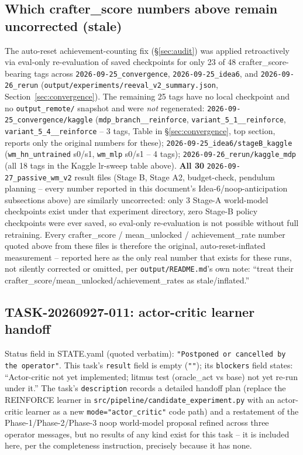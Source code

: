 \documentclass[11pt]{article}
\newcommand{\srcpath}[1]{\texttt{\small #1}}
\begin{document}
\subsection{Which crafter\_score numbers above remain uncorrected (stale)}

The auto-reset achievement-counting fix (\S\ref{sec:audit}) was applied retroactively via
eval-only re-evaluation of saved checkpoints for only 23 of 48 crafter\_score-bearing tags across
\srcpath{2026-09-25\_convergence}, \srcpath{2026-09-25\_idea6}, and \srcpath{2026-09-26\_rerun}
(\srcpath{output/experiments/reeval\_v2\_summary.json}, Section~\ref{sec:convergence}). The
remaining 25 tags have no local checkpoint and no \srcpath{output\_remote/} snapshot and were
\emph{not} regenerated: \texttt{2026-09-25\_convergence/kaggle} (\texttt{mdp\_branch\_\_reinforce},
\texttt{variant\_5\_1\_\_reinforce}, \texttt{variant\_5\_4\_\_reinforce} -- 3 tags, Table in
\S\ref{sec:convergence}, top section, reports only the original numbers for these);
\texttt{2026-09-25\_idea6/stageB\_kaggle} (\texttt{wm\_hn\_untrained} s0/s1,
\texttt{wm\_mlp} s0/s1 -- 4 tags); \texttt{2026-09-26\_rerun/kaggle\_mdp} (all 18 tags in the
Kaggle lr-sweep table above). \textbf{All 30} \srcpath{2026-09-27\_passive\_wm\_v2} result files
(Stage B, Stage A2, budget-check, pendulum planning -- every number reported in this document's
Idea-6/noop-anticipation subsections above) are similarly uncorrected: only 3 Stage-A world-model
checkpoints exist under that experiment directory, zero Stage-B policy checkpoints were ever
saved, so eval-only re-evaluation is not possible without full retraining. Every crafter\_score /
mean\_unlocked / achievement\_rate number quoted above from these files is therefore the original,
auto-reset-inflated measurement -- reported here as the only real number that exists for these
runs, not silently corrected or omitted, per \srcpath{output/README.md}'s own note: ``treat their
crafter\_score/mean\_unlocked/achievement\_rates as stale/inflated.''

\subsection{TASK-20260927-011: actor-critic learner handoff}
\label{sec:task011}

Status field in STATE.yaml (quoted verbatim): \texttt{"Postponed or cancelled by the operator"}.
This task's \texttt{result} field is empty (\texttt{""}); its \texttt{blockers} field states:
``Actor-critic not yet implemented; litmus test (oracle\_act vs base) not yet re-run under it.'' The
task's \texttt{description} records a detailed handoff plan (replace the REINFORCE learner in
\srcpath{src/pipeline/candidate\_experiment.py} with an actor-critic learner as a new
\texttt{mode="actor\_critic"} code path) and a restatement of the Phase-1/Phase-2/Phase-3 noop
world-model proposal refined across three operator messages, but no results of any kind exist for
this task -- it is included here, per the completeness instruction, precisely because it has none.
\end{document}
